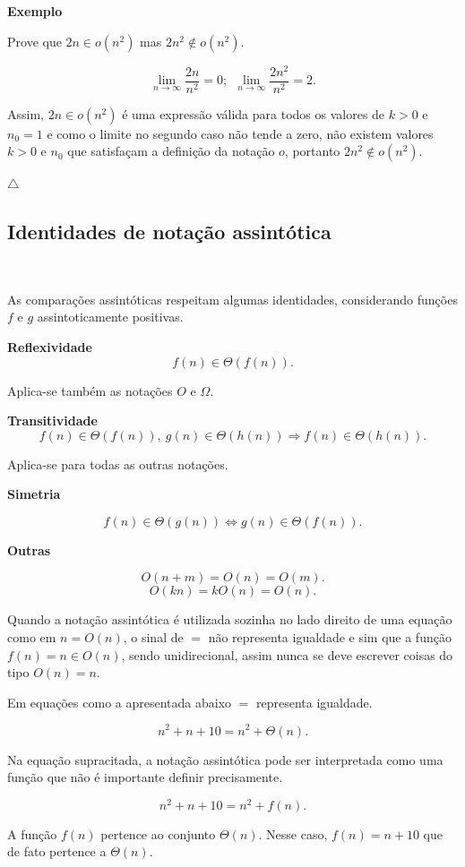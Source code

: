 \textbf{Exemplo}

Prove que $2n\in o(n^2)$ mas $2n^2\notin o(n^2)$.

\[\lim_{n\rightarrow\infty}\frac{2n}{n^2}=0; \ \ \lim_{n\rightarrow\infty}\frac{2n^2}{n^2}=2.\]

Assim, $2n\in o(n^2)$ é uma expressão válida para todos os valores de $k>0$ e $n_0=1$ e como o limite no segundo caso não tende a zero, não existem valores $k>0$ e $n_0$ que satisfaçam a definição da notação $o$, portanto $2n^2\notin o(n^2)$.

{\raggedleft $\bigtriangleup$ \par}

\subsection{Identidades de notação assintótica}
\

As comparações assintóticas respeitam algumas identidades, considerando funções $f$ e $g$ assintoticamente positivas.

\textbf{Reflexividade}
\[f(n)\in\Theta(f(n)).\]

Aplica-se também as notações $O$ e $\Omega$.

\textbf{Transitividade}
\[f(n)\in\Theta(f(n)), \ g(n)\in\Theta(h(n)) \Rightarrow f(n)\in\Theta(h(n)).\]

Aplica-se para todas as outras notações.

\textbf{Simetria}

\[f(n)\in\Theta(g(n)) \Leftrightarrow g(n)\in\Theta(f(n)).\]

\textbf{Outras}

\[O(n+m)=O(n)=O(m).\]
\[O(kn)=kO(n)=O(n).\]

Quando a notação assintótica é utilizada sozinha no lado direito de uma equação como em $n=O(n)$, o sinal de $=$ não representa igualdade e sim que a função $f(n)=n\in O(n)$, sendo unidirecional, assim nunca se deve escrever coisas do tipo $O(n)=n$.

Em equações como a apresentada abaixo $=$ representa igualdade.

\[n^2+n+10=n^2+\Theta(n).\]

Na equação supracitada, a notação assintótica pode ser interpretada como uma função que não é importante definir precisamente.

\[n^2+n+10=n^2+f(n).\]

A função $f(n)$ pertence ao conjunto $\Theta(n)$. Nesse caso, $f(n)=n+10$ que de fato pertence a $\Theta(n)$.

